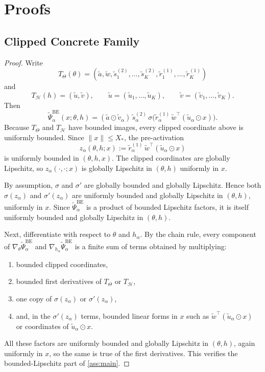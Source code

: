 \documentclass[11pt]{article}
\theoremstyle{definition}
\begin{document}
\section{Proofs}
\label{sec:appendix-proofs}

\subsection{Clipped Concrete Family}

\begin{proof}
Write
\[
  T_\Theta(\theta)
  =
  (\widetilde a,\widetilde w,\widetilde s_1^{(2)},\dots,\widetilde s_K^{(2)},
  \widetilde r_1^{(1)},\dots,\widetilde r_K^{(1)})
\]
and
\[
  T_\mathcal H(h)=(\widetilde u,\widetilde v),
  \qquad
  \widetilde u=(\widetilde u_1,\dots,\widetilde u_K),
  \qquad
  \widetilde v=(\widetilde v_1,\dots,\widetilde v_K).
\]
Then
\[
  \widetilde\Psi_\alpha^{\mathrm{BE}}(x;\theta,h)
  =
  (\widetilde a\odot \widetilde v_\alpha)\,\widetilde s_\alpha^{(2)}\,
  \sigma\!\bigl(
    \widetilde r_\alpha^{(1)}\,\widetilde w^\top(\widetilde u_\alpha\odot x)
  \bigr).
\]
Because $T_\Theta$ and $T_\mathcal H$ have bounded images, every clipped
coordinate above is uniformly bounded. Since $\|x\|\le X_*$, the pre-activation
\[
  z_\alpha(\theta,h;x)
  :=
  \widetilde r_\alpha^{(1)}\,\widetilde w^\top(\widetilde u_\alpha\odot x)
\]
is uniformly bounded in $(\theta,h,x)$. The clipped coordinates are globally
Lipschitz, so $z_\alpha(\cdot,\cdot;x)$ is globally Lipschitz in $(\theta,h)$
uniformly in $x$.

By assumption, $\sigma$ and $\sigma'$ are globally bounded and globally
Lipschitz. Hence both $\sigma(z_\alpha)$ and $\sigma'(z_\alpha)$ are uniformly
bounded and globally Lipschitz in $(\theta,h)$, uniformly in $x$. Since
$\widetilde\Psi_\alpha^{\mathrm{BE}}$ is a product of bounded Lipschitz factors,
it is itself uniformly bounded and globally Lipschitz in $(\theta,h)$.

Next, differentiate with respect to $\theta$ and $h_\alpha$. By the chain rule,
every component of $\nabla_\theta\widetilde\Psi_\alpha^{\mathrm{BE}}$ and
$\nabla_{h_\alpha}\widetilde\Psi_\alpha^{\mathrm{BE}}$ is a finite sum of terms
obtained by multiplying:
\begin{enumerate}[label=(\roman*),leftmargin=2em]
  \item bounded clipped coordinates,
  \item bounded first derivatives of $T_\Theta$ or $T_\mathcal H$,
  \item one copy of $\sigma(z_\alpha)$ or $\sigma'(z_\alpha)$,
  \item and, in the $\sigma'(z_\alpha)$ terms, bounded linear forms in $x$ such
  as $\widetilde w^\top(\widetilde u_\alpha\odot x)$ or coordinates of
  $\widetilde u_\alpha\odot x$.
\end{enumerate}
All these factors are uniformly bounded and globally Lipschitz in $(\theta,h)$,
again uniformly in $x$, so the same is true of the first derivatives. This
verifies the bounded-Lipschitz part of \cref{ass:main}.


\end{proof}
\end{document}
